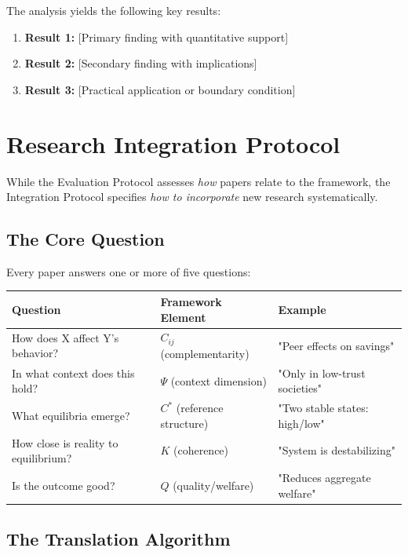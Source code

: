 The analysis yields the following key results:

\begin{enumerate}
    \item \textbf{Result 1:} [Primary finding with quantitative support]
    \item \textbf{Result 2:} [Secondary finding with implications]
    \item \textbf{Result 3:} [Practical application or boundary condition]
\end{enumerate}


\section{Research Integration Protocol}
\label{sec:integration-protocol}

While the Evaluation Protocol assesses \emph{how} papers relate to the framework,
the Integration Protocol specifies \emph{how to incorporate} new research systematically.

\subsection{The Core Question}

Every paper answers one or more of five questions:

\begin{center}
\renewcommand{\arraystretch}{1.4}
\begin{tabular}{|l|l|l|}
\hline
\textbf{Question} & \textbf{Framework Element} & \textbf{Example} \\
\hline
How does X affect Y's behavior? & $C_{ij}$ (complementarity) & "Peer effects on savings" \\
In what context does this hold? & $\Psi$ (context dimension) & "Only in low-trust societies" \\
What equilibria emerge? & $C^*$ (reference structure) & "Two stable states: high/low" \\
How close is reality to equilibrium? & $K$ (coherence) & "System is destabilizing" \\
Is the outcome good? & $Q$ (quality/welfare) & "Reduces aggregate welfare" \\
\hline
\end{tabular}
\end{center}

\subsection{The Translation Algorithm}

